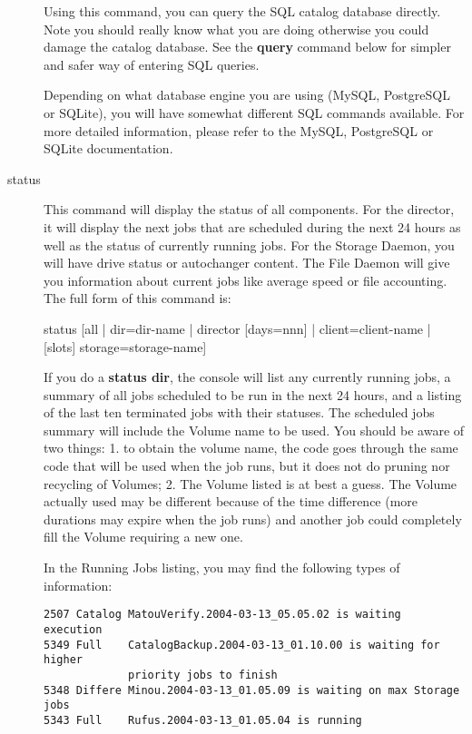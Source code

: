 \begin{description}
   Using this command, you can query the SQL catalog database directly.
   Note you should really know what you are doing otherwise you could
   damage the catalog database.  See the {\bf query} command below for
   simpler and safer way of entering SQL queries.

   Depending on what database engine you are using (MySQL, PostgreSQL or
   SQLite), you will have somewhat different SQL commands available.  For
   more detailed information, please refer to the MySQL, PostgreSQL or
   SQLite documentation.

\item [status]

   This command will display the status of all components. For the director, it
   will display the next jobs that are scheduled during the next 24 hours as
   well as the status of currently running jobs. For the Storage Daemon, you
   will have drive status or autochanger content. The File Daemon will give you
   information about current jobs like average speed or file accounting. The
   full form of this command is:

status [all | dir=\lt{}dir-name\gt{} | director [days=nnn] | 
  client=\lt{}client-name\gt{} | [slots] storage=\lt{}storage-name\gt{}]

   If you do a {\bf status dir}, the console will list any currently
   running jobs, a summary of all jobs scheduled to be run in the next 24
   hours, and a listing of the last ten terminated jobs with their statuses.
   The scheduled jobs summary will include the Volume name to be used.  You
   should be aware of two things: 1. to obtain the volume name, the code
   goes through the same code that will be used when the job runs, but it
   does not do pruning nor recycling of Volumes; 2.  The Volume listed is
   at best a guess.  The Volume actually used may be different because of
   the time difference (more durations may expire when the job runs) and
   another job could completely fill the Volume requiring a new one.

   In the Running Jobs listing, you may find the following types of
   information:


\footnotesize
\begin{verbatim}
2507 Catalog MatouVerify.2004-03-13_05.05.02 is waiting execution
5349 Full    CatalogBackup.2004-03-13_01.10.00 is waiting for higher
             priority jobs to finish
5348 Differe Minou.2004-03-13_01.05.09 is waiting on max Storage jobs
5343 Full    Rufus.2004-03-13_01.05.04 is running
\end{verbatim}
\normalsize


\end{description}
